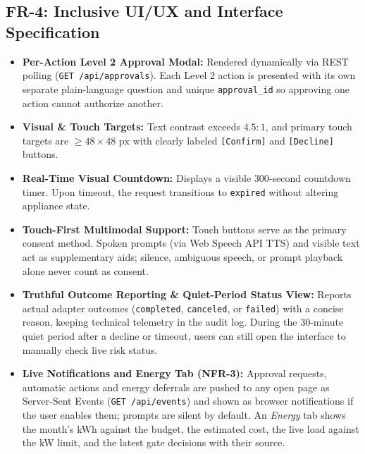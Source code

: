 \documentclass[conference]{IEEEtran}
\begin{document}
\subsection{FR-4: Inclusive UI/UX and Interface Specification}
\begin{itemize}
    \item \textbf{Per-Action Level 2 Approval Modal:} Rendered dynamically via REST polling (\texttt{GET /api/approvals}). Each Level 2 action is presented with its own separate plain-language question and unique \texttt{approval\_id} so approving one action cannot authorize another.
    \item \textbf{Visual \& Touch Targets:} Text contrast exceeds $4.5:1$, and primary touch targets are $\ge 48 \times 48\text{ px}$ with clearly labeled \texttt{[Confirm]} and \texttt{[Decline]} buttons.
    \item \textbf{Real-Time Visual Countdown:} Displays a visible 300-second countdown timer. Upon timeout, the request transitions to \texttt{expired} without altering appliance state.
    \item \textbf{Touch-First Multimodal Support:} Touch buttons serve as the primary consent method. Spoken prompts (via Web Speech API TTS) and visible text act as supplementary aids; silence, ambiguous speech, or prompt playback alone never count as consent.
    \item \textbf{Truthful Outcome Reporting \& Quiet-Period Status View:} Reports actual adapter outcomes (\texttt{completed}, \texttt{canceled}, or \texttt{failed}) with a concise reason, keeping technical telemetry in the audit log. During the 30-minute quiet period after a decline or timeout, users can still open the interface to manually check live risk status.
    \item \textbf{Live Notifications and Energy Tab (NFR-3):} Approval requests, automatic actions and energy deferrals are pushed to any open page as Server-Sent Events (\texttt{GET /api/events}) and shown as browser notifications if the user enables them; prompts are silent by default. An \emph{Energy} tab shows the month's kWh against the budget, the estimated cost, the live load against the kW limit, and the latest gate decisions with their source.
\end{itemize}
\end{document}
